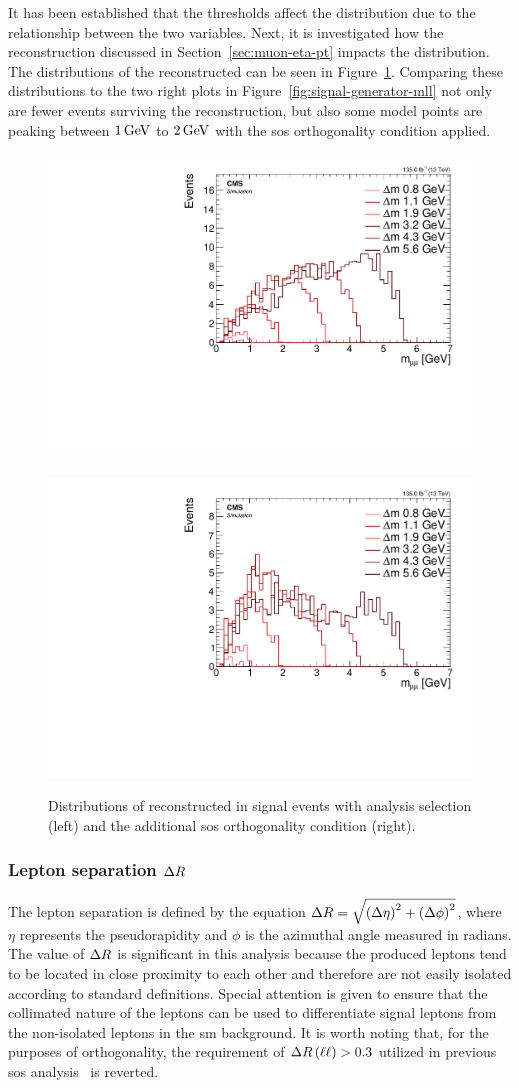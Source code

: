 It has been established that the \pt thresholds affect the \mll distribution due to the relationship between the two variables. Next, it is investigated how the reconstruction discussed in Section~\ref{sec:muon-eta-pt} impacts the \mmumu distribution. The distributions of the reconstructed \mmumu can be seen in Figure~\ref{fig:reco-signal-invamass}. Comparing these distributions to the two right plots in Figure~\ref{fig:signal-generator-mll} not only are fewer events surviving the reconstruction, but also some \dm model points are peaking between $1 \,\text{Ge\hspace{-.08em}V}$ to $2 \,\text{Ge\hspace{-.08em}V}$ with the \gls{sos} orthogonality condition applied.

\begin{figure}[!htb]
\centering
\includegraphics[width=0.48\linewidth]{plots/signal_muons/none_invMassCorrJetNoMultIso10Dr0.6.pdf} \,
\includegraphics[width=0.48\linewidth]{plots/signal_muons/none_invMassCorrJetNoMultIso10Dr0.6_orth.pdf}  \\
\caption[Distributions of reconstructed \mmumu in signal events]{ Distributions of reconstructed \mmumu in signal events with analysis selection (left) and the additional \gls{sos} orthogonality condition (right).}
\label{fig:reco-signal-invamass}
\end{figure}

\subsubsection{Lepton separation $\Delta R$}
\label{sec:lepton-dr}

The lepton separation is defined by the equation $\Delta R=\sqrt{\left(\Delta\eta\right)^2+\left(\Delta\phi\right)^2}$, where $\eta$ represents the pseudorapidity and $\phi$ is the azimuthal angle measured in radians. The value of $\Delta R$ is significant in this analysis because the produced leptons tend to be located in close proximity to each other and therefore are not easily isolated according to standard definitions. Special attention is given to ensure that the collimated nature of the leptons can be used to differentiate signal leptons from the non-isolated leptons in the \gls{sm} background. It is worth noting that, for the purposes of orthogonality, the requirement of $\Delta R\left(\ell\ell\right) > 0.3$ utilized in previous \gls{sos} analysis~\citep{sos} is reverted.

